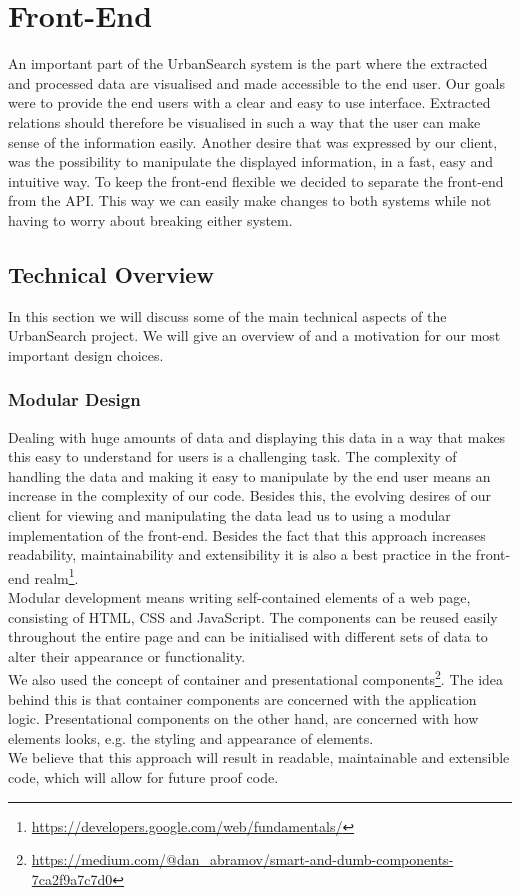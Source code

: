 \section{Front-End}\label{sec:5-front-end}
An important part of the UrbanSearch system is the part where the extracted and processed data are visualised and made accessible to the end user. Our goals were to provide the end users with a clear and easy to use interface. Extracted relations should therefore be visualised in such a way that the user can make sense of the information easily. Another desire that was expressed by our client, was the possibility to manipulate the displayed information, in a fast, easy and intuitive way. To keep the front-end flexible we decided to separate the front-end from the API. This way we can easily make changes to both systems while not having to worry about breaking either system.

\subsection{Technical Overview}
In this section we will discuss some of the main technical aspects of the UrbanSearch project. We will give an overview of and a motivation for our most important design choices.

\subsubsection{Modular Design}
Dealing with huge amounts of data and displaying this data in a way that makes this easy to understand for users is a challenging task. The complexity of handling the data and making it easy to manipulate by the end user means an increase in the complexity of our code. Besides this, the evolving desires of our client for viewing and manipulating the data lead us to using a modular implementation of the front-end.
Besides the fact that this approach increases readability, maintainability and extensibility it is also a best practice in the front-end realm\footnote{\url{https://developers.google.com/web/fundamentals/}}.\\
Modular development means writing self-contained elements of a web page, consisting of HTML, CSS and JavaScript. The components can be reused easily throughout the entire page and can be initialised with different sets of data to alter their appearance or functionality.\\
We also used the concept of container and presentational components\footnote{\url{https://medium.com/@dan_abramov/smart-and-dumb-components-7ca2f9a7c7d0}}. The idea behind this is that container components are concerned with the application logic. Presentational components on the other hand, are concerned with how elements looks, e.g. the styling and appearance of elements.\\
We believe that this approach will result in readable, maintainable and extensible code, which will allow for future proof code.
